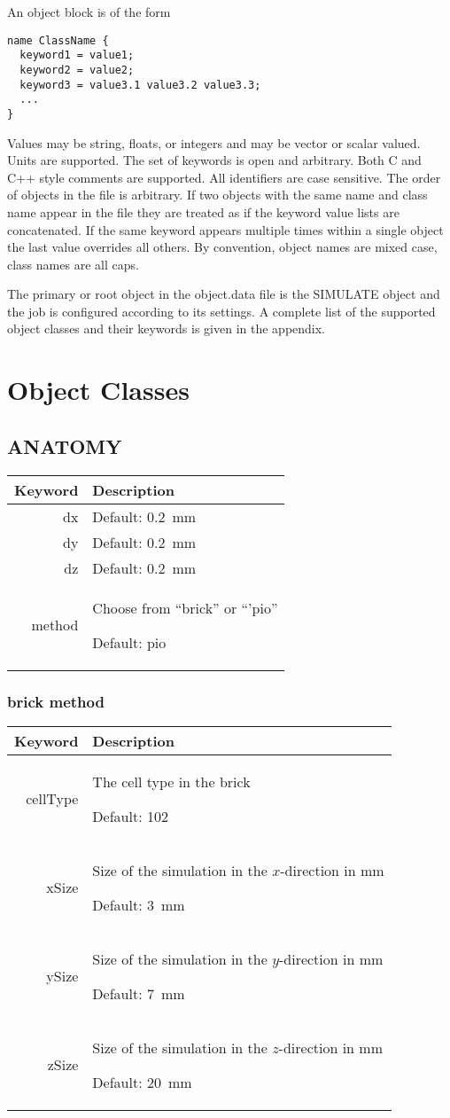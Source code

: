\documentclass{article}
\begin{document}
An object block is of the form
\begin{verbatim}
name ClassName { 
  keyword1 = value1; 
  keyword2 = value2;
  keyword3 = value3.1 value3.2 value3.3;
  ...
}
\end{verbatim}
Values may be string, floats, or integers and may be vector or scalar
valued.  Units are supported.  The set of keywords is open and
arbitrary.  Both C and C++ style comments are supported.  All
identifiers are case sensitive.  The order of objects in the file is
arbitrary.  If two objects with the same name and class name appear in
the file they are treated as if the keyword value lists are
concatenated.  If the same keyword appears multiple times within a
single object the last value overrides all others.  By convention,
object names are mixed case, class names are all caps.


The primary or root object in the object.data file is the SIMULATE
object and the job is configured according to its settings.  A complete
list of the supported object classes and their keywords is given in the
appendix.




\appendix

\section{Object Classes}

\newenvironment{keywords}
{
  \par\vspace{12pt}\noindent
  \begin{tabular}{|r|p{0.7\textwidth}|}
    \hline
    Keyword & Description \\ \hline
  }
  {
  \end{tabular}
}

\def\kw#1#2#3{%
  #1 & {#2 \par Default: #3}\\ \hline%
}


\subsection{ANATOMY}
\begin{keywords}
  \kw{dx}{}{0.2~mm}
  \kw{dy}{}{0.2~mm}
  \kw{dz}{}{0.2~mm}
  \kw{method}{Choose from ``brick'' or ``'pio''}{pio}
\end{keywords}

\subsubsection{brick method}
\begin{keywords}
  \kw{cellType}{The cell type in the brick}{102}
  \kw{xSize}{Size of the simulation in the $x$-direction in mm}{3~mm}
  \kw{ySize}{Size of the simulation in the $y$-direction in mm}{7~mm}
  \kw{zSize}{Size of the simulation in the $z$-direction in mm}{20~mm}
\end{keywords}
\end{document}
